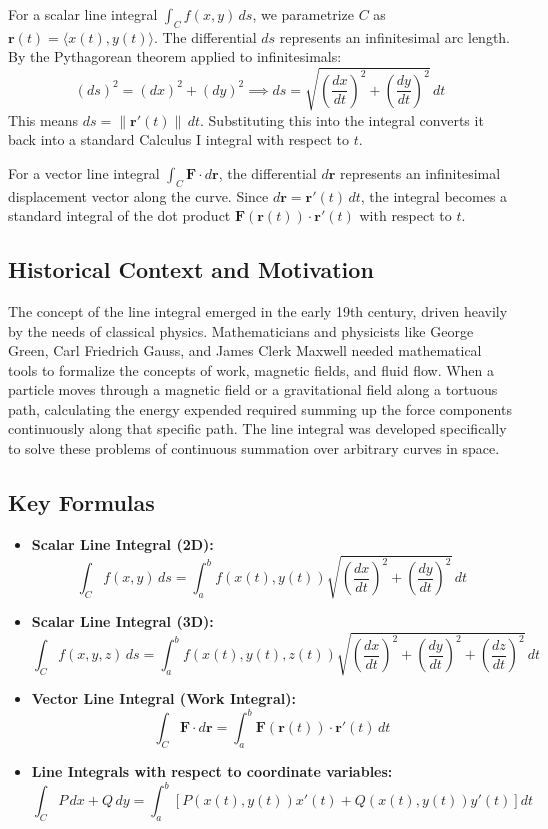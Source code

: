 \documentclass{article}
\begin{document}
For a scalar line integral $\int_C f(x, y) \, ds$, we parametrize $C$ as $\mathbf{r}(t) = \langle x(t), y(t) \rangle$. The differential $ds$ represents an infinitesimal arc length. By the Pythagorean theorem applied to infinitesimals:
\[ (ds)^2 = (dx)^2 + (dy)^2 \implies ds = \sqrt{\left(\frac{dx}{dt}\right)^2 + \left(\frac{dy}{dt}\right)^2} \, dt \]
This means $ds = \|\mathbf{r}'(t)\| \, dt$. Substituting this into the integral converts it back into a standard Calculus I integral with respect to $t$.

For a vector line integral $\int_C \mathbf{F} \cdot d\mathbf{r}$, the differential $d\mathbf{r}$ represents an infinitesimal displacement vector along the curve. Since $d\mathbf{r} = \mathbf{r}'(t) \, dt$, the integral becomes a standard integral of the dot product $\mathbf{F}(\mathbf{r}(t)) \cdot \mathbf{r}'(t)$ with respect to $t$.

\subsection{Historical Context and Motivation}
The concept of the line integral emerged in the early 19th century, driven heavily by the needs of classical physics. Mathematicians and physicists like George Green, Carl Friedrich Gauss, and James Clerk Maxwell needed mathematical tools to formalize the concepts of work, magnetic fields, and fluid flow. When a particle moves through a magnetic field or a gravitational field along a tortuous path, calculating the energy expended required summing up the force components continuously along that specific path. The line integral was developed specifically to solve these problems of continuous summation over arbitrary curves in space.

\subsection{Key Formulas}
\begin{itemize}
    \item \textbf{Scalar Line Integral (2D):} 
    \[ \int_C f(x, y) \, ds = \int_a^b f(x(t), y(t)) \sqrt{\left(\frac{dx}{dt}\right)^2 + \left(\frac{dy}{dt}\right)^2} \, dt \]
    \item \textbf{Scalar Line Integral (3D):} 
    \[ \int_C f(x, y, z) \, ds = \int_a^b f(x(t), y(t), z(t)) \sqrt{\left(\frac{dx}{dt}\right)^2 + \left(\frac{dy}{dt}\right)^2 + \left(\frac{dz}{dt}\right)^2} \, dt \]
    \item \textbf{Vector Line Integral (Work Integral):} 
    \[ \int_C \mathbf{F} \cdot d\mathbf{r} = \int_a^b \mathbf{F}(\mathbf{r}(t)) \cdot \mathbf{r}'(t) \, dt \]
    \item \textbf{Line Integrals with respect to coordinate variables:} 
    \[ \int_C P \, dx + Q \, dy = \int_a^b \left[ P(x(t), y(t)) x'(t) + Q(x(t), y(t)) y'(t) \right] dt \]
\end{itemize}
\end{document}
